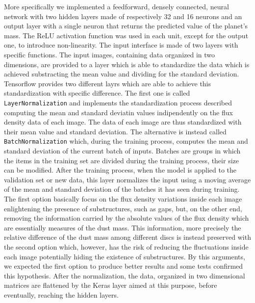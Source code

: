 \documentclass[a4paper,10pt]{report}
\begin{document}
More specifically we implemented a feedforward, densely connected, neural network with two hidden layers
made of respectively 32 and 16 neurons and an output layer with a single neuron that returns the predicted value of the planet's mass.
The ReLU activation function was used in each unit, except for the output one, to introduce non-linearity.
The input interface is made of two layers with specific functions.
The input images, containing data organized in two dimensions, are provided to a layer which is able to standardize the data which
is achieved substracting the mean value and dividing for the standard deviation.
Tensorflow provides two different layrs which are able to achieve this standardization with specific difference.
The first one is called \lstinline{LayerNormalization} and implements the standardization process described computing the mean and standard deviatin
values indipendently on the flux density data of each image. The data of each image are thus standardized with their mean value and standard deviation.
The alternative is instead called \lstinline{BatchNormalization} which, during the training process, 
computes the mean and standard deviation of the current batch of inputs. Batches are groups in which the items in the training set are divided during 
the training process, their size can be modified. After the training process, when the model is applied to the validation set or new data, 
this layer normalizes the input using a moving average of the mean and standard deviation of the batches it has seen during training.
The first option basically focus on the flux density variations inside each image enlightening the presence of substructures, such as gaps, 
but, on the other end, removing the information carried by the absolute values of the flux density which are essentially measures
of the dust mass. This information, more precisely the relative difference of the dust mass among different discs is instead preserved 
with the second option which, however, has the risk of reducing the fluctuations inside each image potentially hiding the existence
of substructures.
By this arguments, we expected the first option to produce better results and some tests confirmed this hypothesis.
After the normalization, the data, organized in two dimensional matrices are flattened by the Keras layer aimed at this purpose, before
eventually, reaching the hidden layers.
\end{document}
